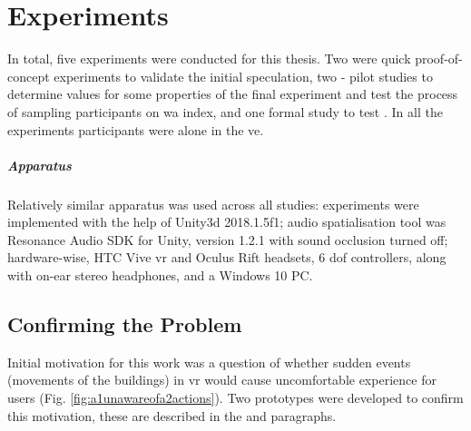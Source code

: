 
\chapter{Experiments}


In total, five experiments were conducted for this thesis. Two were quick proof-of-concept experiments to validate the initial speculation, two - pilot studies to determine values for some properties of the final experiment and test the process of sampling participants on \gls{wa} index, and one formal study to test . 
In all the experiments participants were alone in the \gls{ve}.

\paragraph{Apparatus} %
Relatively similar apparatus was used across all studies:
experiments were implemented with the help of Unity3d  2018.1.5f1; audio spatialisation tool was Resonance Audio SDK for Unity, version 1.2.1 with sound occlusion turned off; hardware-wise, HTC Vive \gls{vr} and Oculus Rift headsets, 6 \gls{dof} controllers, along with on-ear stereo headphones, and a Windows 10 PC. 


\section{Confirming the Problem}

Initial motivation for this work was a question of whether sudden events (movements of the buildings) in \gls{vr} would cause uncomfortable experience for users (Fig. \ref{fig:a1unawareofa2actions}). Two prototypes were developed to confirm this motivation, these are described in the  and  paragraphs.


